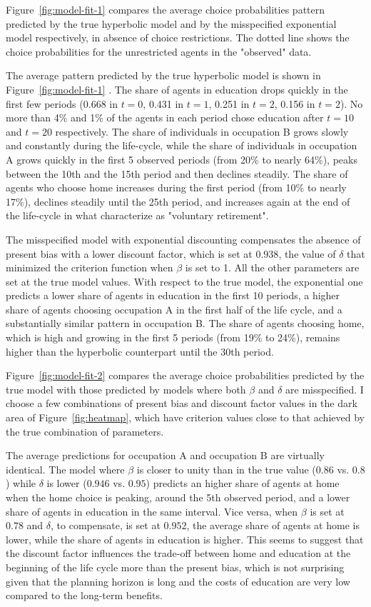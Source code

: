 Figure~\ref{fig:model-fit-1} compares the average choice probabilities pattern predicted by the true hyperbolic model and by the misspecified exponential model respectively, in absence of choice restrictions. The dotted line shows the choice probabilities for the unrestricted agents in the "observed" data.

The average pattern predicted by the true hyperbolic model is shown in Figure~\ref{fig:model-fit-1} . The share of agents in education drops quickly in the first few periods (0.668 in $t=0$, 0.431 in $t=1$, 0.251 in $t=2$, 0.156 in $t=2$). No more than 4\% and 1\% of the agents in each period chose education after $t=10$ and $t=20$ respectively.
The share of individuals in occupation B grows slowly and constantly during the life-cycle, while the share of individuals in occupation A grows quickly in the first 5 observed periods (from 20\% to nearly 64\%), peaks between the 10th and the 15th period and then declines steadily. 
The share of agents who choose home increases during the first period (from 10\% to nearly 17\%), declines steadily until the 25th period, and increases again at the end of the life-cycle in what \textcite{KeaneWolpin1994} characterize as "voluntary retirement". 

The misspecified model with exponential discounting compensates the absence of present bias with a lower discount factor, which is set at $0.938$, the value of $\delta$ that minimized the criterion function when $\beta$ is set to 1. All the other parameters are set at the true model values. With respect to the true model, the exponential one predicts a lower share of agents in education in the first 10 periods, a higher share of agents choosing occupation A in the first half of the life cycle, and a substantially similar pattern in occupation B. The share of agents choosing home, which is high and growing in the first 5 periods (from 19\% to 24\%), remains higher than the hyperbolic counterpart until the 30th period. 

Figure~\ref{fig:model-fit-2} compares the average choice probabilities predicted by the true model with those predicted by models where both $\beta$ and $\delta$ are misspecified. I choose a few combinations of present bias and discount factor values in the dark area of Figure~\ref{fig:heatmap}, which have criterion values close to that achieved by the true combination of parameters. 
 
The average predictions for occupation A and occupation B are virtually identical. The model where $\beta$ is closer to unity than in the true value ($0.86$ vs. $0.8$) while $\delta$ is lower ($0.946$ vs. $0.95$) predicts an higher share of agents at home when the home choice is peaking, around the 5th observed period, and a lower share of agents in education in the same interval. Vice versa, when $\beta$ is set at $0.78$ and $\delta$, to compensate, is set at $0.952$, the average share of agents at home is lower, while the share of agents in education is higher. This seems to suggest that the discount factor influences the trade-off between home and education at the beginning of the life cycle more than the present bias, which is not surprising given that the planning horizon is long and the costs of education are very low compared to the long-term benefits.


